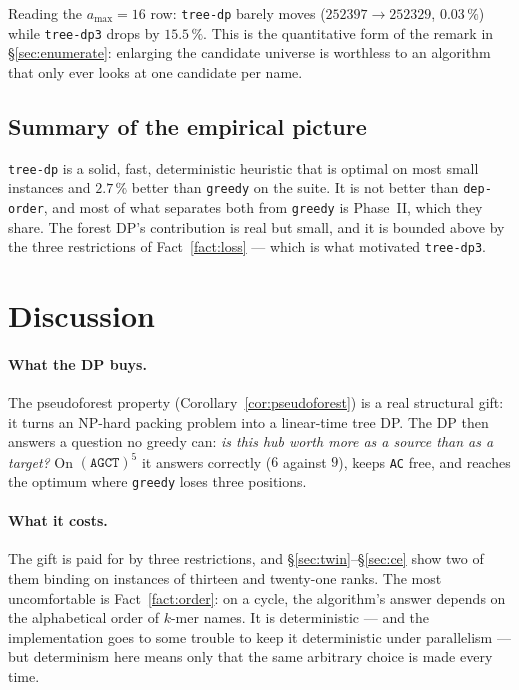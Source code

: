 \documentclass[11pt,a4paper]{article}
\theoremstyle{definition}
\theoremstyle{plain}
\theoremstyle{remark}
\begin{document}
Reading the $a_{\max} = 16$ row: \texttt{tree-dp} barely moves
($252397 \to 252329$, $0.03\,\%$) while \texttt{tree-dp3} drops by
$15.5\,\%$. This is the quantitative form of the remark in
\S\ref{sec:enumerate}: enlarging the candidate universe is worthless to
an algorithm that only ever looks at one candidate per name.

\subsection{Summary of the empirical picture}

\texttt{tree-dp} is a solid, fast, deterministic heuristic that is
optimal on most small instances and $2.7\,\%$ better than \texttt{greedy}
on the suite. It is not better than \texttt{dep-order}, and most of what
separates both from \texttt{greedy} is Phase~II, which they share. The
forest DP's contribution is real but small, and it is bounded above by
the three restrictions of Fact~\ref{fact:loss} --- which is what motivated
\texttt{tree-dp3}.

\section{Discussion}
\label{sec:discussion}

\paragraph{What the DP buys.}
The pseudoforest property (Corollary~\ref{cor:pseudoforest}) is a real
structural gift: it turns an NP-hard packing problem into a linear-time
tree DP. The DP then answers a question no greedy can: \emph{is this hub
worth more as a source than as a target?} On $(\mathtt{AGCT})^5$ it
answers correctly ($6$ against $9$), keeps \texttt{AC} free, and reaches
the optimum where \texttt{greedy} loses three positions.

\paragraph{What it costs.}
The gift is paid for by three restrictions, and
\S\ref{sec:twin}--\S\ref{sec:ce} show two of them binding on instances
of thirteen and twenty-one ranks. The most uncomfortable is
Fact~\ref{fact:order}: on a cycle, the algorithm's answer depends on the
alphabetical order of $k$-mer names. It is deterministic --- and the
implementation goes to some trouble to keep it deterministic under
parallelism --- but determinism here means only that the same arbitrary
choice is made every time.
\end{document}
